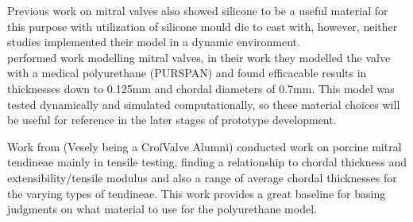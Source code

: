 Previous work on mitral valves  also showed silicone to be a useful material for this purpose with utilization of silicone mould die to cast with, however, neither studies implemented their model in a dynamic environment.
\\
 performed work modelling mitral valves, in their work they modelled the valve with a medical polyurethane (PURSPAN) and found efficacable results in thicknesses down to 0.125mm and chordal diameters of 0.7mm. This model was tested dynamically and simulated computationally, so these material choices will be useful for reference in the later stages of prototype development.

Work from  (Vesely being a CroíValve Alumni) conducted work on porcine mitral tendineae mainly in tensile testing, finding a relationship to chordal thickness and extensibility/tensile modulus and also a range of average chordal thicknesses for the varying types of tendineae. This work provides a great baseline for basing judgments on what material to use for the polyurethane model.

